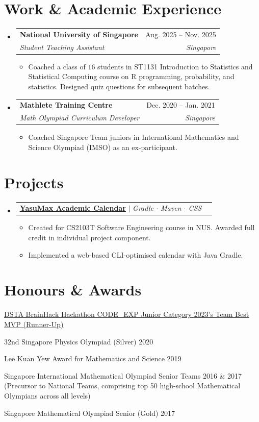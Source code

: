 \documentclass[letterpaper,7pt]{article}
\makeatletter
\newcommand{\link}[2]{\href{#1}{\color{blue}\underline{#2}}}
\newcommand{\resumeItem}[1]{\item\small{{#1 \vspace{-2pt}}}}
\newcommand{\resumeSubheading}[4]{
  \vspace{-3pt}\item
  \begin{tabular*}{0.97\textwidth}[t]{l@{\extracolsep{\fill}}r}
    \textbf{#1} & #2 \\
    \textit{\small#3} & \textit{\small #4} \\
  \end{tabular*}\vspace{-8pt}
}
\newcommand{\resumeProjectHeading}[2]{
  \item
  \begin{tabular*}{0.97\textwidth}{l@{\extracolsep{\fill}}r}
    \small#1 & #2 \\
  \end{tabular*}\vspace{-8pt}
}
\newenvironment{resumeSubHeadingList}{\begin{itemize}[leftmargin=0.15in, label={}]}{\end{itemize}}
\newenvironment{resumeItemList}{\begin{itemize}}{\end{itemize}}
\makeatother
\begin{document}
\section{Work \& Academic Experience}
\begin{resumeSubHeadingList}
\resumeSubheading{National University of Singapore}{Aug. 2025 -- Nov. 2025}{Student Teaching Assistant}{Singapore}
\begin{resumeItemList}
    \resumeItem{Coached a class of $16$ students in ST1131 Introduction to Statistics and Statistical Computing course on R programming, probability, and statistics. Designed quiz questions for subsequent batches.}
\end{resumeItemList}
\resumeSubheading{Mathlete Training Centre}{Dec. 2020 -- Jan. 2021}{Math Olympiad Curriculum Developer}{Singapore}
\begin{resumeItemList}
    \resumeItem{Coached Singapore Team juniors in International Mathematics and Science Olympiad (IMSO) as an ex-participant.}
\end{resumeItemList}
\end{resumeSubHeadingList}

\section{Projects}
\begin{resumeSubHeadingList}
\resumeProjectHeading{\link{https://github.com/Mingyuan03/yasumax}{\textbf{YasuMax Academic Calendar}} $|$ \emph{Gradle $\cdot$ Maven $\cdot$ CSS}}{}
\begin{resumeItemList}
    \resumeItem{Created for CS2103T Software Engineering course in NUS. Awarded full credit in individual project component.}
    \resumeItem{Implemented a web-based CLI-optimised calendar with Java Gradle.}
\end{resumeItemList}
\end{resumeSubHeadingList}

\section{Honours \& Awards}
\begin{itemize}[leftmargin=0.15in,label={$\star$},itemsep=-0.3em]
    \small{\item{\link{https://certificates.nextid.com/certificate?id=7d81aed6-5d6a-408d-b030-9e592d215015}{DSTA BrainHack Hackathon CODE\_EXP Junior Category 2023's Team Best MVP (Runner-Up)}}}
    \small{\item{$32$nd Singapore Physics Olympiad (Silver) 2020}}
    \small{\item{Lee Kuan Yew Award for Mathematics and Science 2019}}
    \small{\item{Singapore International Mathematical Olympiad Senior Teams 2016 \& 2017 (Precursor to National Teams, comprising top 50 high-school Mathematical Olympians across all levels)}}
    \small{\item{Singapore Mathematical Olympiad Senior (Gold) 2017}}
\end{itemize}
\end{document}
